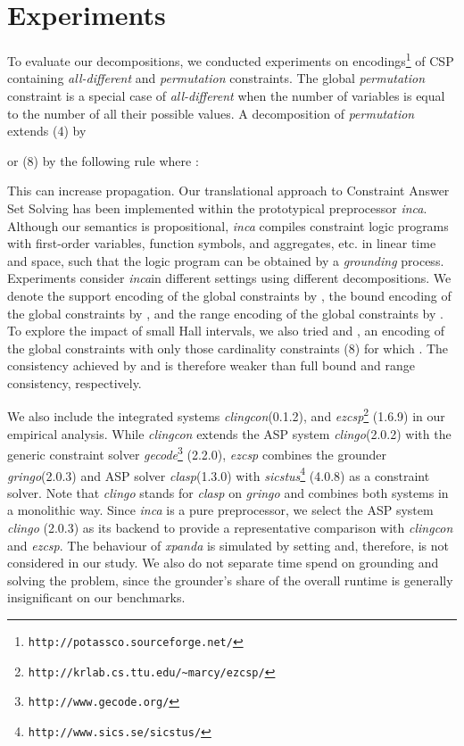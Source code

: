 \documentclass{tlp}
\newcommand{\systemname}[1]{\emph{#1}}
\newcommand{\encsup}{}
\newcommand{\encbou}{}
\newcommand{\encran}{}
\newcommand{\encbouh}[1]{\encbou}
\newcommand{\encranh}[1]{\encran}
\begin{document}
\section{Experiments} \label{sec:exp}

To evaluate our decompositions, we conducted experiments on encodings\footnote[1]{\texttt{http://potassco.sourceforge.net/}} of CSP containing \emph{all-different} and \emph{permutation} constraints.
The global \emph{permutation} constraint is a special case of \emph{all-different} when the number of variables is equal to the number of all their possible values. A decomposition of \emph{permutation} extends (4) by

or (8) by the following rule where :

This can increase propagation.
Our translational approach to Constraint Answer Set Solving has been implemented within the prototypical preprocessor \systemname{inca}.
Although our semantics is propositional, \systemname{inca} compiles constraint logic programs with first-order variables, function symbols, and aggregates, etc. in linear time and space, such that the logic program can be obtained by a \emph{grounding} process.
Experiments consider \systemname{inca}\footnotemark[1] in different settings using different decompositions. We denote the support encoding of the global constraints by \encsup, the bound encoding of the global constraints by \encbou, and the range encoding of the global constraints by \encran. To explore the impact of small Hall intervals, we also tried \encbouh{k} and \encranh{k}, an encoding of the global constraints with only those cardinality constraints (8) for which . The consistency achieved by \encbouh{k} and \encranh{k} is therefore weaker than full bound and range consistency, respectively.

We also include the integrated systems \systemname{clingcon}\footnotemark[1] (0.1.2), and \systemname{ezcsp}\footnote[2]{\texttt{http://krlab.cs.ttu.edu/\~{}marcy/ezcsp/}} (1.6.9) in our empirical analysis.
While \systemname{clingcon} extends the ASP system \systemname{clingo}\footnotemark[1] (2.0.2) with the generic constraint solver \systemname{gecode}\footnote[3]{\texttt{http://www.gecode.org/}} (2.2.0), \systemname{ezcsp} combines the grounder \systemname{gringo}\footnotemark[1] (2.0.3) and ASP solver \systemname{clasp}\footnotemark[1] (1.3.0) with \systemname{sicstus}\footnote[4]{\texttt{http://www.sics.se/sicstus/}} (4.0.8) as a constraint solver.
Note that \systemname{clingo} stands for \systemname{clasp} on \systemname{gringo} and combines both systems in a monolithic way. Since \systemname{inca} is a pure preprocessor, we select the ASP system \systemname{clingo} (2.0.3) as its backend to provide a representative comparison with \systemname{clingcon} and \systemname{ezcsp}.
The behaviour of \systemname{xpanda} is simulated by setting \encsup{} and, therefore, is not considered in our study. We also do not separate time spend on grounding and solving the problem, since the grounder's share of the overall runtime is generally insignificant on our benchmarks.
\end{document}
